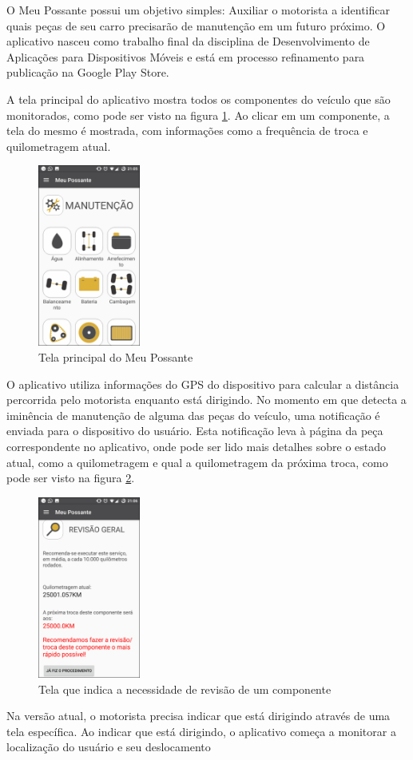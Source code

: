 O Meu Possante possui um objetivo simples: Auxiliar o motorista a identificar quais
peças de seu carro precisarão de manutenção em um futuro próximo. O aplicativo nasceu
como trabalho final da disciplina de Desenvolvimento de Aplicações para Dispositivos
Móveis e está em processo refinamento para publicação na Google Play Store.

A tela principal do aplicativo mostra todos os componentes do veículo que são monitorados,
como pode ser visto na figura \ref{meu-possante-tela-principal}. Ao clicar em um componente,
a tela do mesmo é mostrada, com informações como a frequência de troca e quilometragem
atual.

\begin{figure}[h]
\centering
\includegraphics[width=0.3\textwidth]{images/meu-possante-tela-principal.png}
\caption{Tela principal do Meu Possante}
\label{meu-possante-tela-principal}
\end{figure}

O aplicativo utiliza informações do GPS do dispositivo para calcular a distância percorrida
pelo motorista enquanto está dirigindo. No momento em que detecta a iminência de manutenção
de alguma das peças do veículo, uma notificação é enviada para o dispositivo do usuário.
Esta notificação leva à página da peça correspondente no aplicativo, onde pode ser lido
mais detalhes sobre o estado atual, como a quilometragem e qual a quilometragem da
próxima troca, como pode ser visto na figura \ref{meu-possante-tela-componente}.

\begin{figure}[h]
\centering
\includegraphics[width=0.3\textwidth]{images/meu-possante-tela-componente.png}
\caption{Tela que indica a necessidade de revisão de um componente}
\label{meu-possante-tela-componente}
\end{figure}

Na versão atual, o motorista precisa indicar que está dirigindo através de uma tela
específica. Ao indicar que está dirigindo, o aplicativo começa a monitorar a localização
do usuário e seu deslocamento
